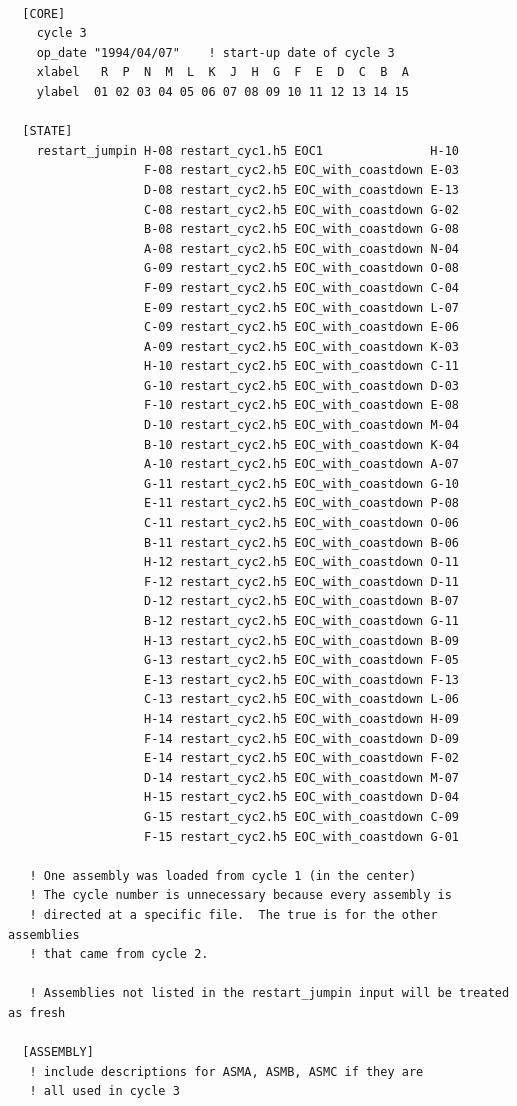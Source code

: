 \begin{Verbatim}[fontsize=\small]

  [CORE]
    cycle 3
    op_date "1994/04/07"    ! start-up date of cycle 3
    xlabel   R  P  N  M  L  K  J  H  G  F  E  D  C  B  A
    ylabel  01 02 03 04 05 06 07 08 09 10 11 12 13 14 15

  [STATE]
    restart_jumpin H-08 restart_cyc1.h5 EOC1               H-10
                   F-08 restart_cyc2.h5 EOC_with_coastdown E-03
                   D-08 restart_cyc2.h5 EOC_with_coastdown E-13
                   C-08 restart_cyc2.h5 EOC_with_coastdown G-02
                   B-08 restart_cyc2.h5 EOC_with_coastdown G-08
                   A-08 restart_cyc2.h5 EOC_with_coastdown N-04
                   G-09 restart_cyc2.h5 EOC_with_coastdown O-08
                   F-09 restart_cyc2.h5 EOC_with_coastdown C-04
                   E-09 restart_cyc2.h5 EOC_with_coastdown L-07
                   C-09 restart_cyc2.h5 EOC_with_coastdown E-06
                   A-09 restart_cyc2.h5 EOC_with_coastdown K-03
                   H-10 restart_cyc2.h5 EOC_with_coastdown C-11
                   G-10 restart_cyc2.h5 EOC_with_coastdown D-03
                   F-10 restart_cyc2.h5 EOC_with_coastdown E-08
                   D-10 restart_cyc2.h5 EOC_with_coastdown M-04
                   B-10 restart_cyc2.h5 EOC_with_coastdown K-04
                   A-10 restart_cyc2.h5 EOC_with_coastdown A-07
                   G-11 restart_cyc2.h5 EOC_with_coastdown G-10
                   E-11 restart_cyc2.h5 EOC_with_coastdown P-08
                   C-11 restart_cyc2.h5 EOC_with_coastdown O-06
                   B-11 restart_cyc2.h5 EOC_with_coastdown B-06
                   H-12 restart_cyc2.h5 EOC_with_coastdown O-11
                   F-12 restart_cyc2.h5 EOC_with_coastdown D-11
                   D-12 restart_cyc2.h5 EOC_with_coastdown B-07
                   B-12 restart_cyc2.h5 EOC_with_coastdown G-11
                   H-13 restart_cyc2.h5 EOC_with_coastdown B-09
                   G-13 restart_cyc2.h5 EOC_with_coastdown F-05
                   E-13 restart_cyc2.h5 EOC_with_coastdown F-13
                   C-13 restart_cyc2.h5 EOC_with_coastdown L-06
                   H-14 restart_cyc2.h5 EOC_with_coastdown H-09
                   F-14 restart_cyc2.h5 EOC_with_coastdown D-09
                   E-14 restart_cyc2.h5 EOC_with_coastdown F-02
                   D-14 restart_cyc2.h5 EOC_with_coastdown M-07
                   H-15 restart_cyc2.h5 EOC_with_coastdown D-04
                   G-15 restart_cyc2.h5 EOC_with_coastdown C-09
                   F-15 restart_cyc2.h5 EOC_with_coastdown G-01

   ! One assembly was loaded from cycle 1 (in the center)
   ! The cycle number is unnecessary because every assembly is
   ! directed at a specific file.  The true is for the other assemblies
   ! that came from cycle 2.

   ! Assemblies not listed in the restart_jumpin input will be treated as fresh

  [ASSEMBLY]
   ! include descriptions for ASMA, ASMB, ASMC if they are
   ! all used in cycle 3

\end{Verbatim}